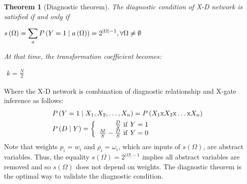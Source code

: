 \documentclass{article}
\numberwithin{equation}{section}
\numberwithin{figure}{section}
\numberwithin{table}{section}
\newtheorem{theorem}{Theorem}[section]
\begin{document}
\begin{theorem}[Diagnostic theorem]
The diagnostic condition of X-D network is satisfied if and only if
\begin{center}
$\begin{aligned}
s\left(\mathrm{\Omega }\right)=\sum_a{P\left(Y=1\mathrel{\left|\vphantom{Y=1 a\left(\mathrm{\Omega }\right)}\right.\kern-\nulldelimiterspace}a\left(\mathrm{\Omega }\right)\right)}=2^{\left|\mathrm{\Omega }\right|-1},\forall \mathrm{\Omega }\neq \emptyset
\end{aligned}$
\end{center}
At that time, the transformation coefficient becomes:
\begin{center}
$\begin{aligned}
k=\frac{N}{2}
\end{aligned}$
\end{center}
\label{theorem:diagnostic-theorem}
\end{theorem}

Where the X-D network is combination of diagnostic relationship and X-gate inference as follows:
\begin{align*}
&P\left(Y=1\mathrel{\left|\vphantom{Y=1 X_1,X_2,\dots ,X_n}\right.\kern-\nulldelimiterspace}X_1,X_2,\dots ,X_n\right)=P\left(X_1\mathrm{x}X_2\mathrm{x}\dots \mathrm{x}X_n\right)\\
&P\left(D\mathrel{\left|\vphantom{D Y}\right.\kern-\nulldelimiterspace}Y\right)=\left\{ \begin{array}{r}
\frac{D}{S}\ \mathrm{if}\ Y=1 \\ 
\frac{M}{S}-\frac{D}{S}\ \mathrm{if}\ Y=0 \end{array}
\right.
\end{align*}
Note that weights $p_i=w_i$ and $\rho_i=\omega_i$, which are inputs of $s\left(\Omega\right)$, are abstract variables. Thus, the equality $s\left(\Omega\right)=2^{\left|\Omega\right|-1}$ implies all abstract variables are removed and so $s\left(\Omega\right)$ does not depend on weights. The diagnostic theorem is the optimal way to validate the diagnostic condition.
\end{document}
